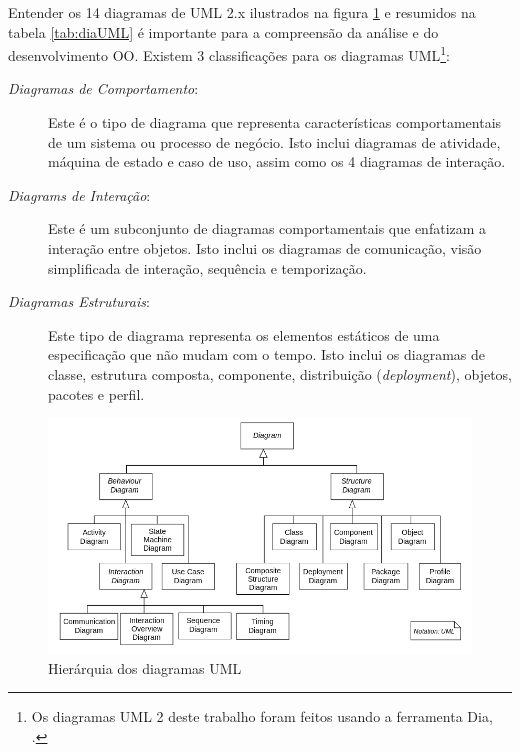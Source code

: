 \documentclass[
	11pt,				%
	openright,
	twoside,			%
	a4paper,			%
	english,			%
	french,
	brazil,				%
	sumario=tradicional
	]{abntex2}
\begin{document}
Entender os 14 diagramas de UML 2.x ilustrados na figura \ref{fig:uml14dia} e resumidos na tabela \ref{tab:diaUML} é importante para a compreensão da análise e do desenvolvimento OO. Existem 3 classificações para os diagramas UML\footnote{Os diagramas UML 2 deste trabalho foram feitos usando a ferramenta Dia, .}:

\begin{description}
\item[\emph{Diagramas de Comportamento}:] Este é o tipo de diagrama que representa características comportamentais de um sistema ou processo de negócio. Isto inclui diagramas de atividade, máquina de estado e caso de uso, assim como os 4 diagramas de interação.

\item[\emph{Diagrams de Interação}:] Este é um subconjunto de diagramas comportamentais que enfatizam a interação entre objetos. Isto inclui os diagramas de comunicação, visão simplificada de interação, sequência e temporização.

\item[\emph{Diagramas Estruturais}:] Este tipo de diagrama representa os elementos estáticos de uma especificação que não mudam com o tempo. Isto inclui os diagramas de classe, estrutura composta, componente, distribuição (\textit{deployment}), objetos, pacotes e perfil.
\end{description}

\begin{figure}[h]
\begin{center}
\includegraphics[scale=0.55]{UML_diagrams_overview.png} 
\caption{Hierárquia dos diagramas UML} \label{fig:uml14dia}
\end{center}
\end{figure}
\end{document}
